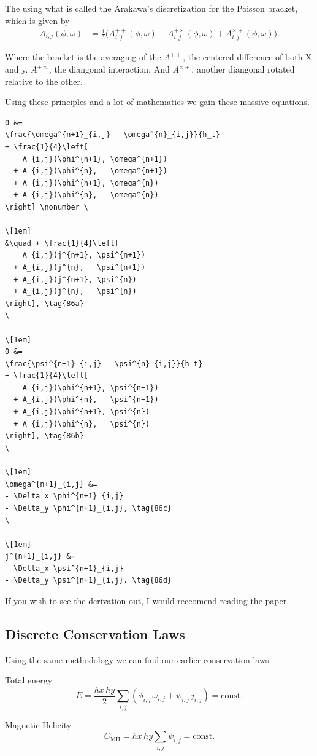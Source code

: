 The using what is called the Arakawa's discretization for the Poisson bracket, which is given by
\begin{align}
	A_{i,j}(\phi,\omega)
	 & = \frac{1}{3} \Big(
	A^{++}_{i,j}(\phi,\omega)
	+ A^{+\times}_{i,j}(\phi,\omega)
	+ A^{\times+}_{i,j}(\phi,\omega)
	\Big).
\end{align}

Where the bracket is the averaging of the $A^{++}$, the centered difference of both X and y. $A^{+ \times}$, the diangonal interaction. And $A^{\times +}$, another diangonal rotated relative to the other.

Using these principles and a lot of mathematics we gain these massive equations.
\begin{verbatim}
0 &=
\frac{\omega^{n+1}_{i,j} - \omega^{n}_{i,j}}{h_t}
+ \frac{1}{4}\left[
    A_{i,j}(\phi^{n+1}, \omega^{n+1})
  + A_{i,j}(\phi^{n},   \omega^{n+1})
  + A_{i,j}(\phi^{n+1}, \omega^{n})
  + A_{i,j}(\phi^{n},   \omega^{n})
\right] \nonumber \

\[1em]
&\quad + \frac{1}{4}\left[
    A_{i,j}(j^{n+1}, \psi^{n+1})
  + A_{i,j}(j^{n},   \psi^{n+1})
  + A_{i,j}(j^{n+1}, \psi^{n})
  + A_{i,j}(j^{n},   \psi^{n})
\right], \tag{86a}
\

\[1em]
0 &=
\frac{\psi^{n+1}_{i,j} - \psi^{n}_{i,j}}{h_t}
+ \frac{1}{4}\left[
    A_{i,j}(\phi^{n+1}, \psi^{n+1})
  + A_{i,j}(\phi^{n},   \psi^{n+1})
  + A_{i,j}(\phi^{n+1}, \psi^{n})
  + A_{i,j}(\phi^{n},   \psi^{n})
\right], \tag{86b}
\

\[1em]
\omega^{n+1}_{i,j} &=
- \Delta_x \phi^{n+1}_{i,j}
- \Delta_y \phi^{n+1}_{i,j}, \tag{86c}
\

\[1em]
j^{n+1}_{i,j} &=
- \Delta_x \psi^{n+1}_{i,j}
- \Delta_y \psi^{n+1}_{i,j}. \tag{86d}
\end{verbatim}


If you wish to see the derivation out, I would reccomend reading the paper.

\subsection{Discrete Conservation Laws}


Using the same methodology we can find our earlier conservation laws

Total energy
\[
	E
	= \frac{hx\,hy}{2}
	\sum_{i,j} \left( \phi_{i,j}\,\omega_{i,j} + \psi_{i,j}\,j_{i,j} \right)
	= \text{const.}
\]

Magnetic Helicity
\[
	C_{\mathrm{MH}}
	= hx\,hy \sum_{i,j} \psi_{i,j}
	= \text{const.}
\]

